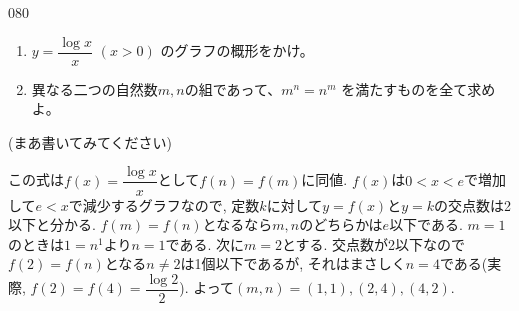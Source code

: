 \begin{thm}{080}{}{}
 \begin{enumerate}
  \item $y=\dfrac{\log x}{x}$ $(x>0)$ のグラフの概形をかけ。
  \item 異なる二つの自然数$m, n$の組であって、$m^n=n^m$ を満たすものを全て求めよ。
 \end{enumerate}
\end{thm}

(まあ書いてみてください) 

この式は$f(x) = \dfrac{\log{x}}{x}$として$f(n) = f(m)$に同値. $f(x)$は$0<x<e$で増加して$e<x$で減少するグラフなので, 定数$k$に対して$y=f(x)$と$y=k$の交点数は2以下と分かる. $f(m) = f(n)$となるなら$m,n$のどちらかは$e$以下である. $m=1$のときは$1=n^1$より$n=1$である. 次に$m=2$とする. 交点数が2以下なので$f(2) = f(n)$となる$n\neq 2$は1個以下であるが, それはまさしく$n=4$である(実際, $f(2)=f(4) = \dfrac{\log{2}}{2}$). よって$(m,n) = (1,1), (2,4), (4,2)$. 